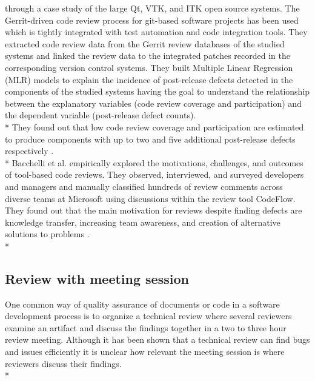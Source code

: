 through a case study of the large Qt, VTK, and ITK open source systems. The Gerrit-driven code review process for git-based software projects has been used which is tightly integrated with test automation and code integration tools. They extracted code review data from the Gerrit review databases of the studied systems and linked the review data to the integrated patches recorded in the corresponding version control systems. They built Multiple Linear Regression (MLR) models to explain the incidence of post-release defects detected in the components of the studied systems having the goal to understand the relationship between the explanatory variables (code review coverage and participation) and the dependent variable (post-release defect counts). \\*
They found out that low code review coverage and participation are estimated to produce components with up to two and five additional post-release defects respectively \cite{McIntosh:2014:ICR:2597073.2597076}. \\*
Bacchelli et al. empirically explored the motivations, challenges, and outcomes of tool-based code reviews. They observed, interviewed, and surveyed developers and managers and manually classified hundreds of review comments across diverse teams at Microsoft using discussions within the review tool CodeFlow. They found out that the main motivation for reviews despite finding defects are knowledge transfer, increasing team awareness, and creation of alternative solutions to problems \cite{Bacchelli:2013:EOC:2486788.2486882}. \\*


\subsection{Review with meeting session}
One common way of quality assurance of documents or code in a software development process is to organize a technical review where several reviewers examine an artifact and discuss the findings together in a two to three hour review meeting. Although it has been shown that a technical review can find bugs and issues efficiently it is unclear how relevant the meeting session is where reviewers discuss their findings. \\*

